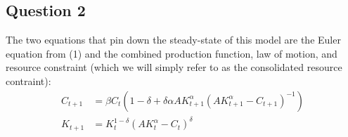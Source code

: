\documentclass{article}
\begin{document}

\subsection*{Question 2}
The two equations that pin down the steady-state of this model are the Euler equation from (1) and the combined production function, law of motion, and resource constraint (which we will simply refer to as the consolidated resource contraint):
\begin{align*}
	C_{t+1} &= \beta C_t\left(1-\delta+\delta\alpha AK^\alpha_{t+1}\left(AK_{t+1}^\alpha - C_{t+1}\right)^{-1}\right)	\\
	K_{t+1} &= K_t^{1-\delta}\left(AK_t^\alpha - C_t\right)^\delta
\end{align*}

\end{document}

